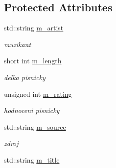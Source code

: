 \subsection*{Protected Attributes}
\begin{DoxyCompactItemize}
\item 
\hypertarget{classTune_ae00b9ea87ce13981c3ab1997f28586d6}{
std::string \hyperlink{classTune_ae00b9ea87ce13981c3ab1997f28586d6}{m\_\-artist}}
\label{classTune_ae00b9ea87ce13981c3ab1997f28586d6}

\begin{DoxyCompactList}\small\item\em muzikant \item\end{DoxyCompactList}\item 
\hypertarget{classTune_ab908e08bbc155bbdf34dbd2672733e45}{
short int \hyperlink{classTune_ab908e08bbc155bbdf34dbd2672733e45}{m\_\-length}}
\label{classTune_ab908e08bbc155bbdf34dbd2672733e45}

\begin{DoxyCompactList}\small\item\em delka pisnicky \item\end{DoxyCompactList}\item 
\hypertarget{classTune_ad2ffd7e5f72895dae8626632cfb740c2}{
unsigned int \hyperlink{classTune_ad2ffd7e5f72895dae8626632cfb740c2}{m\_\-rating}}
\label{classTune_ad2ffd7e5f72895dae8626632cfb740c2}

\begin{DoxyCompactList}\small\item\em hodnoceni pisnicky \item\end{DoxyCompactList}\item 
\hypertarget{classTune_a9a2b63189998d5b50d268fd7cfd3ee38}{
std::string \hyperlink{classTune_a9a2b63189998d5b50d268fd7cfd3ee38}{m\_\-source}}
\label{classTune_a9a2b63189998d5b50d268fd7cfd3ee38}

\begin{DoxyCompactList}\small\item\em zdroj \item\end{DoxyCompactList}\item 
\hypertarget{classTune_af308b3ae57ce0eb7684792ae58c81530}{
std::string \hyperlink{classTune_af308b3ae57ce0eb7684792ae58c81530}{m\_\-title}}
\label{classTune_af308b3ae57ce0eb7684792ae58c81530}


\end{DoxyCompactItemize}
